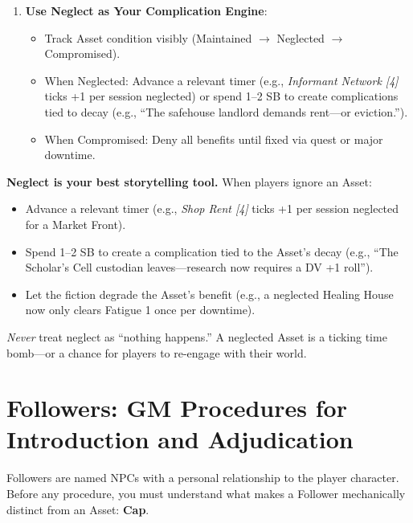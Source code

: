 \begin{enumerate}
\begin{itemize}
          \item \textbf{Never} grant Free Use automatically---ask: ``Does the fiction support using this benefit \emph{now}?'' If no, require a scene of preparation or a Boon spend.  
        \end{itemize}
  \item \textbf{Use Neglect as Your Complication Engine}:  
        \begin{itemize}
          \item Track Asset condition visibly (Maintained $\rightarrow$ Neglected $\rightarrow$ Compromised).  
          \item When Neglected: Advance a relevant timer (e.g., \emph{Informant Network [4]} ticks +1 per session neglected) or spend 1--2 SB to create complications tied to decay (e.g., ``The safehouse landlord demands rent---or eviction.'').  
          \item When Compromised: Deny all benefits until fixed via quest or major downtime.  
        \end{itemize}
\end{enumerate}

\begin{tcolorbox}[colback=blue!5!white,colframe=blue!75!black,title={GM Tip: The Asset Neglect Engine},breakable]
\textbf{Neglect is your best storytelling tool.} When players ignore an Asset:  
\begin{itemize}
  \item Advance a relevant timer (e.g., \emph{Shop Rent [4]} ticks +1 per session neglected for a Market Front).  
  \item Spend 1--2 SB to create a complication tied to the Asset's decay (e.g., ``The Scholar's Cell custodian leaves---research now requires a DV +1 roll'').  
  \item Let the fiction degrade the Asset's benefit (e.g., a neglected Healing House now only clears Fatigue 1 once per downtime).  
\end{itemize}
\textit{Never} treat neglect as ``nothing happens.'' A neglected Asset is a ticking time bomb---or a chance for players to re-engage with their world.
\end{tcolorbox}

\section{Followers: GM Procedures for Introduction and Adjudication}
\label{sec:gm-followers-procedures}
Followers are named NPCs with a personal relationship to the player character. Before any procedure, you must understand what makes a Follower mechanically distinct from an Asset: \textbf{Cap}.

